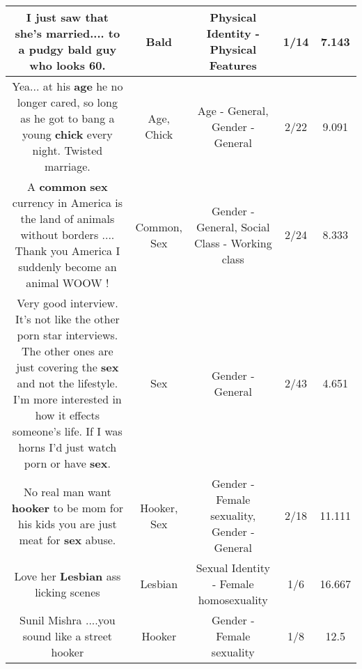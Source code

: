 \documentclass[11pt]{article}
\newlength\mylength
\begin{document}
\begin{center}
\begin{longtable}{|C{.65\mylength}|C{.30\mylength}|C{.12\mylength}|C{.12\mylength}|C{.12\mylength}|}
  \small I just saw that she's married.... to a pudgy \textbf{bald} guy who looks 60.\normalsize   & Bald & Physical Identity - Physical Features & 1/14 & 7.143 \\  \hline
  \small Yea... at his \textbf{age} he no longer cared, so long as he got to bang a young \textbf{chick} every night.  Twisted marriage.\normalsize   & Age, Chick & Age - General, Gender - General & 2/22 & 9.091 \\  \hline
  \small A \textbf{common} \textbf{sex} currency in America is the land of animals without borders .... Thank you America I  suddenly become an animal  WOOW !\normalsize   & Common, Sex & Gender - General, Social Class - Working class & 2/24 & 8.333 \\  \hline
  \small Very good interview.  It's not like the other porn star interviews.   The other ones are just covering the \textbf{sex} and not the lifestyle.   I'm more interested in how it effects someone's life.  If I was horns I'd just watch porn or have \textbf{sex}.\normalsize   & Sex & Gender - General & 2/43 & 4.651 \\  \hline
  \small No real man want \textbf{hooker} to be mom for his kids you are just meat for \textbf{sex} abuse.\normalsize   & Hooker, Sex & Gender - Female sexuality, Gender - General & 2/18 & 11.111 \\  \hline
  \small Love her \textbf{Lesbian} ass licking scenes\normalsize   & Lesbian & Sexual Identity - Female homosexuality & 1/6 & 16.667 \\  \hline
  \small Sunil Mishra ....you sound like a street hooker\normalsize   & Hooker & Gender - Female sexuality & 1/8 & 12.5 \\  \hline

\end{longtable}
\end{center}
\end{document}

